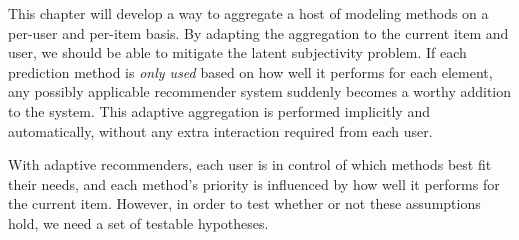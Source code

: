This chapter will develop a way to aggregate a host of modeling methods on a per-user and per-item basis.
By adapting the aggregation to the current item and user, we should be able to mitigate the latent subjectivity problem. 
If each prediction method is \emph{only used} based on how well it performs for each element,
any possibly applicable recommender system suddenly becomes a worthy addition to the system.
This adaptive aggregation is performed implicitly and automatically,
without any extra interaction required from each user.

With adaptive recommenders, each user is in control of which methods best fit their needs, and
each method's priority is influenced by how well it performs for the current item.
However, in order to test whether or not these assumptions hold,
we need a set of testable hypotheses.

\clearpage

